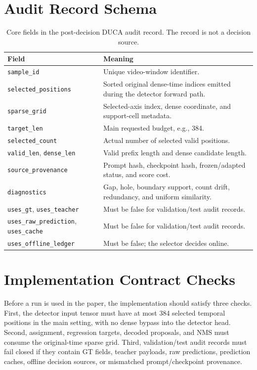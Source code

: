 \section{Audit Record Schema}

\begin{table}[t]
\centering
\caption{Core fields in the post-decision DUCA audit record. The record is not a decision source.}
\label{tab:ledger_schema}
\small
\begin{tabularx}{\textwidth}{p{}X}
\toprule
Field & Meaning \\
\midrule
\texttt{sample\_id} & Unique video-window identifier. \\
\texttt{selected\_positions} & Sorted original dense-time indices emitted during the detector forward path. \\
\texttt{sparse\_grid} & Selected-axis index, dense coordinate, and support-cell metadata. \\
\texttt{target\_len} & Main requested budget, e.g., 384. \\
\texttt{selected\_count} & Actual number of selected valid positions. \\
\texttt{valid\_len}, \texttt{dense\_len} & Valid prefix length and dense candidate length. \\
\texttt{source\_provenance} & Prompt hash, checkpoint hash, frozen/adapted status, and score cost. \\
\texttt{diagnostics} & Gap, hole, boundary support, count drift, redundancy, and uniform similarity. \\
\texttt{uses\_gt}, \texttt{uses\_teacher} & Must be false for validation/test audit records. \\
\texttt{uses\_raw\_prediction}, \texttt{uses\_cache} & Must be false for validation/test audit records. \\
\texttt{uses\_offline\_ledger} & Must be false; the selector decides online. \\
\bottomrule
\end{tabularx}
\end{table}

\section{Implementation Contract Checks}

Before a run is used in the paper, the implementation should satisfy three
checks. First, the detector input tensor must have at most 384 selected temporal
positions in the main setting, with no dense bypass into the detector head.
Second, assignment, regression targets, decoded proposals, and NMS must consume
the original-time sparse grid. Third, validation/test audit records must fail
closed if they contain GT fields, teacher payloads, raw predictions, prediction
caches, offline decision sources, or mismatched prompt/checkpoint provenance.

